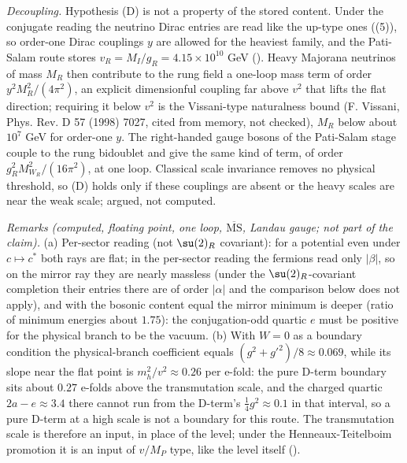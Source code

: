 \emph{Decoupling.} Hypothesis (D) is not a property of the stored content. Under the conjugate reading the neutrino Dirac entries are read like the up-type ones ((5)), so order-one Dirac couplings $y$ are allowed for the heaviest family, and the Pati-Salam route stores $v_{R} = M_{I}/g_{R} = 4.15 \times 10^{10}$ GeV (). Heavy Majorana neutrinos of mass $M_{R}$ then contribute to the rung field a one-loop mass term of order $y^{2}M_{R}^{2}/(4\pi^{2})$, an explicit dimensionful coupling far above $v^{2}$ that lifts the flat direction; requiring it below $v^{2}$ is the Vissani-type naturalness bound (F. Vissani, Phys. Rev. D 57 (1998) 7027, cited from memory, not checked), $M_{R}$ below about $10^{7}$ GeV for order-one $y$. The right-handed gauge bosons of the Pati-Salam stage couple to the rung bidoublet and give the same kind of term, of order $g_{R}^{2}M_{W_{R}}^{2}/(16\pi^{2})$, at one loop. Classical scale invariance removes no physical threshold, so (D) holds only if these couplings are absent or the heavy scales are near the weak scale; argued, not computed.

\emph{Remarks (computed, floating point, one loop, $\overline{\mathrm{MS}}$, Landau gauge; not part of the claim).} (a) Per-sector reading (not $\su(2)_{R}$ covariant): for a potential even under $c \mapsto c^{*}$ both rays are flat; in the per-sector reading the fermions read only $|\beta|$, so on the mirror ray they are nearly massless (under the $\su(2)_{R}$-covariant completion their entries there are of order $|\alpha|$ and the comparison below does not apply), and with the bosonic content equal the mirror minimum is deeper (ratio of minimum energies about $1.75$): the conjugation-odd quartic $e$ must be positive for the physical branch to be the vacuum. (b) With $W = 0$ as a boundary condition the physical-branch coefficient equals $(g^{2} + g'^{2})/8 \approx 0.069$, while its slope near the flat point is $m_{h}^{2}/v^{2} \approx 0.26$ per e-fold: the pure D-term boundary sits about $0.27$ e-folds above the transmutation scale, and the charged quartic $2a - e \approx 3.4$ there cannot run from the D-term's $\tfrac14 g^{2} \approx 0.1$ in that interval, so a pure D-term at a high scale is not a boundary for this route. The transmutation scale is therefore an input, in place of the level; under the Henneaux-Teitelboim promotion it is an input of $v/M_{P}$ type, like the level itself ().
